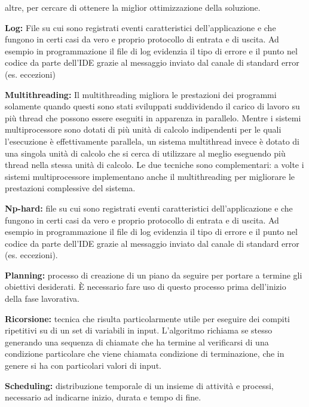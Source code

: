 \begin{description}
    altre, per cercare di ottenere la miglior ottimizzazione della soluzione.
    \item \label{Log} \textbf{Log:} File su cui sono registrati eventi caratteristici dell’applicazione e che fungono
    in certi casi da vero e proprio protocollo di entrata e di uscita. Ad esempio in
    programmazione il file di log evidenzia il tipo di errore e il punto nel codice
    da parte dell’IDE grazie al messaggio inviato dal canale di standard error (es. eccezioni)
    \item \label{Multithreading} \textbf{Multithreading:} Il multithreading migliora le prestazioni dei programmi solamente quando questi sono stati sviluppati suddividendo il carico di lavoro su più thread
     che possono essere eseguiti in apparenza in parallelo. Mentre i sistemi multiprocessore sono dotati di più unità di calcolo indipendenti per le quali l'esecuzione è effettivamente parallela, un sistema
     multithread invece è dotato di una singola unità di calcolo che si cerca di utilizzare al meglio eseguendo più thread nella stessa unità di calcolo. Le due tecniche sono complementari: a volte i sistemi
     multiprocessore implementano anche il multithreading per migliorare le prestazioni complessive del sistema.
    \item \label{Np-hard} \textbf{Np-hard:} file su cui sono registrati eventi caratteristici dell’applicazione e che fungono
    in certi casi da vero e proprio protocollo di entrata e di uscita. Ad esempio in
    programmazione il file di log evidenzia il tipo di errore e il punto nel codice
    da parte dell’IDE grazie al messaggio inviato dal canale di standard error (es.
    eccezioni).
    \item \label{Planning} \textbf{Planning:} processo di creazione di un piano da seguire per portare a termine gli obiettivi desiderati. È necessario fare uso di questo processo prima dell'inizio della fase lavorativa.
    \item \label{Ricorsione} \textbf{Ricorsione:} tecnica che risulta particolarmente utile per eseguire dei compiti ripetitivi su di un set di variabili in input.
    L'algoritmo richiama se stesso generando una sequenza di chiamate che ha termine al verificarsi di una condizione particolare che viene chiamata condizione di terminazione, che in genere si ha con particolari
    valori di input.
    \item \label{Scheduling} \textbf{Scheduling:} distribuzione temporale di un insieme di attività e processi, necessario ad indicarne inizio, durata e tempo di fine.

\end{description}
